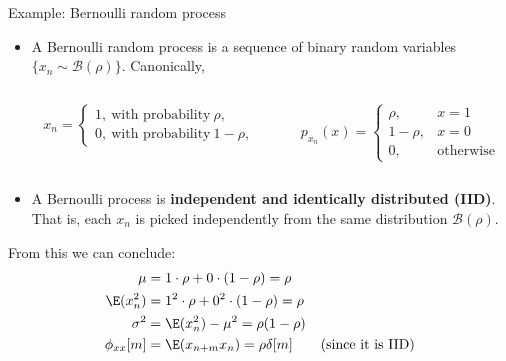\documentclass[10pt, aspectratio=169]{beamer}
\begin{document}
\begin{frame}{Example: Bernoulli random process}
	
	\begin{itemize}
		\item A Bernoulli random process is a sequence of binary random variables $\{x_n \sim \mathcal{B}(\rho)\}$. Canonically, 
		\begin{columns}
			\begin{column}{0.5\linewidth}
				\begin{equation*}
				x_n = \begin{cases}
				1,~\text{with probability}~\rho, \\
				0,~\text{with probability}~1-\rho,
				\end{cases}
				\end{equation*}
			\end{column}
			\begin{column}{0.5\linewidth}
				\begin{equation*}
				p_{x_n}(x) = \begin{cases}
				\rho, &x = 1 \\
				1-\rho, &x = 0 \\
				0, &\text{otherwise}
				\end{cases}
				\end{equation*}
			\end{column}
		\end{columns}
		\item A Bernoulli process is \textbf{independent and identically distributed (IID)}. That is, each $x_n$ is picked independently from the same distribution $\mathcal{B}(\rho)$.
	\end{itemize}
	From this we can conclude:
	\begin{align*} 
	\mu &= 1\cdot\rho + 0\cdot(1-\rho) = \rho \\
	\E(x_n^2) &= 1^2\cdot\rho + 0^2\cdot(1-\rho) = \rho \\
	\sigma^2 &= \E(x_n^2) - \mu^2 = \rho(1 - \rho) \\
	\phi_{xx}[m] &=\E(x_{n+m}x_n) = \rho\delta[m] \tag{since it is IID}
	\end{align*}
	
\end{frame}
\end{document}
